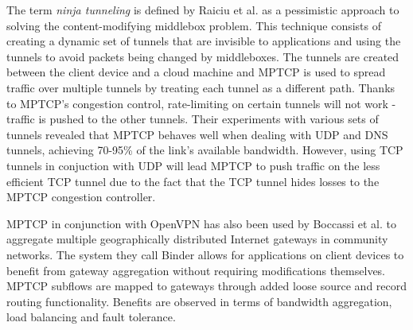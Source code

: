 
The term \textit{ninja tunneling} is defined by Raiciu et al. \cite{goodcop} as a pessimistic approach to solving the content-modifying middlebox problem. This technique consists of creating a dynamic set of tunnels that are invisible to applications and using the tunnels to avoid packets being changed by middleboxes. The tunnels are created between the client device and a cloud machine and MPTCP is used to spread traffic over multiple tunnels by treating each tunnel as a different path. Thanks to MPTCP's congestion control, rate-limiting on certain tunnels will not work - traffic is pushed to the other tunnels. Their experiments with various sets of tunnels revealed that MPTCP behaves well when dealing with UDP and DNS tunnels, achieving 70-95\% of the link's available bandwidth. However, using TCP tunnels in conjuction with UDP will lead MPTCP to push traffic on the less efficient TCP tunnel due to the fact that the TCP tunnel hides losses to the MPTCP congestion controller.

MPTCP in conjunction with OpenVPN has also been used by Boccassi et al. \cite{binder} to aggregate multiple geographically distributed Internet gateways in community networks. The system they call Binder allows for applications on client devices to benefit from gateway aggregation without requiring modifications themselves. MPTCP subflows are mapped to gateways through added loose source and record routing functionality. Benefits are observed in terms of bandwidth aggregation, load balancing and fault tolerance.

